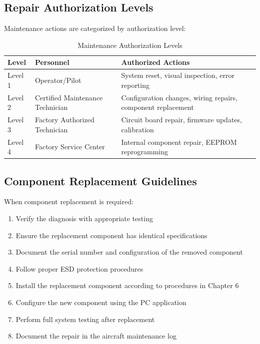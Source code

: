 \documentclass[12pt,a4paper,twoside,openright]{book}
\newcommand{\tabletextfont}{\normalfont\rmfamily}
\newcommand{\tableheadfont}{\normalfont\bfseries}
\begin{document}
\subsection{Repair Authorization Levels}

Maintenance actions are categorized by authorization level:

\begin{table}[h]
\centering
\setlength{\tabcolsep}{5pt} %
\begin{tabular}{|p{}|p{}|p{}|}
\hline
\tableheadfont\textbf{Level} & \tableheadfont\textbf{Personnel} & \tableheadfont\textbf{Authorized Actions} \\
\hline
\tabletextfont Level 1 & Operator/Pilot & System reset, visual inspection, error reporting \\
\hline
\tabletextfont Level 2 & Certified Maintenance Technician & Configuration changes, wiring repairs, component replacement \\
\hline
\tabletextfont Level 3 & Factory Authorized Technician & Circuit board repair, firmware updates, calibration \\
\hline
\tabletextfont Level 4 & Factory Service Center & Internal component repair, EEPROM reprogramming \\
\hline
\end{tabular}
\caption{Maintenance Authorization Levels}
\end{table}

\subsection{Component Replacement Guidelines}

When component replacement is required:

\begin{enumerate}
    \item Verify the diagnosis with appropriate testing
    \item Ensure the replacement component has identical specifications
    \item Document the serial number and configuration of the removed component
    \item Follow proper ESD protection procedures
    \item Install the replacement component according to procedures in Chapter 6
    \item Configure the new component using the PC application
    \item Perform full system testing after replacement
    \item Document the repair in the aircraft maintenance log
\end{enumerate}
\end{document}
